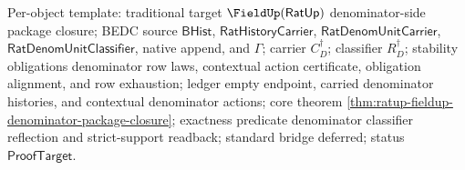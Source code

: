 Per-object template: traditional target
$\FieldUp(\mathsf{RatUp})$ denominator-side package closure; BEDC source
$\mathsf{BHist}$, $\mathsf{RatHistoryCarrier}$,
$\mathsf{RatDenomUnitCarrier}$, $\mathsf{RatDenomUnitClassifier}$, native
append, and $\Gamma$; carrier $C_D^\dagger$; classifier $R_D^\dagger$;
stability obligations denominator row laws, contextual action certificate,
obligation alignment, and row exhaustion; ledger empty endpoint, carried
denominator histories, and contextual denominator actions; core theorem
\autoref{thm:ratup-fieldup-denominator-package-closure}; exactness predicate
denominator classifier reflection and strict-support readback; standard bridge
deferred; status $\mathsf{ProofTarget}$.
